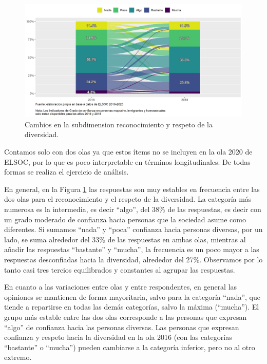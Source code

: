 \documentclass[
  12pt,
]{book}
\begin{document}
\begin{figure}[H]

{\centering \includegraphics[width=1\linewidth,height=1\textheight]{output/graphs/alluvial_diversidad} 

}

\caption{Cambios en la subdimension reconocimiento y respeto de la diversidad.}\label{fig:alluvial-diversidad}
\end{figure}

Contamos solo con dos olas ya que estos ítems no se incluyen en la ola 2020 de ELSOC, por lo que es poco interpretable en términos longitudinales. De todas formas se realiza el ejercicio de análisis.

En general, en la Figura \ref{fig:alluvial-diversidad} las respuestas son muy estables en frecuencia entre las dos olas para el reconocimiento y el respeto de la diversidad. La categoría más numerosa es la intermedia, es decir ``algo'', del 38\% de las respuestas, es decir con un grado moderado de confianza hacia personas que la sociedad asume como diferentes. Si sumamos ``nada'' y ``poca'' confianza hacia personas diversas, por un lado, se suma alrededor del 33\% de las respuestas en ambas olas, mientras al añadir las respuestas ``bastante'' y ``mucha'', la frecuencia es un poco mayor a las respuestas desconfiadas hacia la diversidad, alrededor del 27\%. Observamos por lo tanto casi tres tercios equilibrados y constantes al agrupar las respuestas.

En cuanto a las variaciones entre olas y entre respondentes, en general las opiniones se mantienen de forma mayoritaria, salvo para la categoría ``nada'', que tiende a repartirse en todas las demás categorías, salvo la máxima (``mucha''). El grupo más estable entre las dos olas corresponde a las personas que expresan ``algo'' de confianza hacia las personas diversas. Las personas que expresan confianza y respeto hacia la diversidad en la ola 2016 (con las categorías ``bastante'' o ``mucha'') pueden cambiarse a la categoría inferior, pero no al otro extremo.
\end{document}
